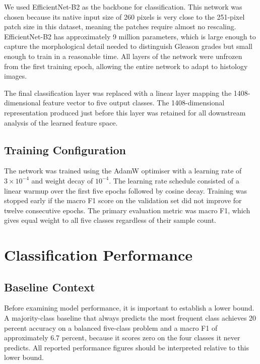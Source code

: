 \documentclass[12pt, a4paper]{article}
\begin{document}
We used EfficientNet-B2 \citep{efficientnet} as the backbone for classification.
This network was chosen because its native input size of 260 pixels is very close
to the 251-pixel patch size in this dataset, meaning the patches require almost no
rescaling. EfficientNet-B2 has approximately 9 million parameters, which is large
enough to capture the morphological detail needed to distinguish Gleason grades
but small enough to train in a reasonable time. All layers of the network were
unfrozen from the first training epoch, allowing the entire network to adapt to
histology images.

The final classification layer was replaced with a linear layer mapping the
1408-dimensional feature vector to five output classes. The 1408-dimensional
representation produced just before this layer was retained for all downstream
analysis of the learned feature space.

\subsection{Training Configuration}

The network was trained using the AdamW optimiser with a learning rate of
$3\times10^{-4}$ and weight decay of $10^{-4}$. The learning rate schedule
consisted of a linear warmup over the first five epochs followed by cosine
decay. Training was stopped early if the macro F1 score on the validation set
did not improve for twelve consecutive epochs. The primary evaluation metric
was macro F1, which gives equal weight to all five classes regardless of their
sample count.

\section{Classification Performance}

\subsection{Baseline Context}

Before examining model performance, it is important to establish a lower bound.
A majority-class baseline that always predicts the most frequent class achieves
20 percent accuracy on a balanced five-class problem and a macro F1 of approximately
6.7 percent, because it scores zero on the four classes it never predicts. All
reported performance figures should be interpreted relative to this lower bound.
\end{document}
